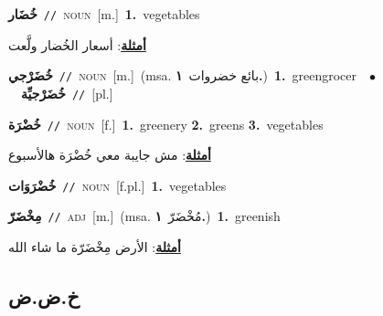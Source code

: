 \documentclass[10pt,a4paper,twoside]{article} %
\begin{document}
\begin{multicols}{2}
{\setlength\topsep{0pt}\textbf{\foreignlanguage{arabic}{خُضَار}}\ {\color{gray}\texttt{//}\color{black}}\ \textsc{noun}\ [m.]\ \textbf{1.}~vegetables\  \begin{flushright}\color{gray}\foreignlanguage{arabic}{\textbf{\underline{\foreignlanguage{arabic}{أمثلة}}}: أسعار الخُضار ولَّعت}\end{flushright}\color{black}} \vspace{2mm}

{\setlength\topsep{0pt}\textbf{\foreignlanguage{arabic}{خُضَرْجي}}\ {\color{gray}\texttt{//}\color{black}}\ \textsc{noun}\ [m.]\ \color{gray}(msa. \foreignlanguage{arabic}{بائع خضروات}~\foreignlanguage{arabic}{\textbf{١.}})\color{black}\ \textbf{1.}~greengrocer\ \ $\bullet$\ \ \setlength\topsep{0pt}\textbf{\foreignlanguage{arabic}{خُضَرْجيِّة}}\ {\color{gray}\texttt{//}\color{black}}\ [pl.]\ } \vspace{2mm}

{\setlength\topsep{0pt}\textbf{\foreignlanguage{arabic}{خُضْرَة}}\ {\color{gray}\texttt{//}\color{black}}\ \textsc{noun}\ [f.]\ \textbf{1.}~greenery  \textbf{2.}~greens  \textbf{3.}~vegetables\  \begin{flushright}\color{gray}\foreignlanguage{arabic}{\textbf{\underline{\foreignlanguage{arabic}{أمثلة}}}: مش جايبة معي خُضْرَة هالأسبوع}\end{flushright}\color{black}} \vspace{2mm}

{\setlength\topsep{0pt}\textbf{\foreignlanguage{arabic}{خُضْرَوَات}}\ {\color{gray}\texttt{//}\color{black}}\ \textsc{noun}\ [f.pl.]\ \textbf{1.}~vegetables\ } \vspace{2mm}

{\setlength\topsep{0pt}\textbf{\foreignlanguage{arabic}{مِخْضَرّ}}\ {\color{gray}\texttt{//}\color{black}}\ \textsc{adj}\ [m.]\ \color{gray}(msa. \foreignlanguage{arabic}{مُخْضَرّ}~\foreignlanguage{arabic}{\textbf{١.}})\color{black}\ \textbf{1.}~greenish\  \begin{flushright}\color{gray}\foreignlanguage{arabic}{\textbf{\underline{\foreignlanguage{arabic}{أمثلة}}}: الأرض مِخْضَرّة ما شاء الله}\end{flushright}\color{black}} \vspace{2mm}

\vspace{-3mm}
\subsection*{\color{blue}\foreignlanguage{arabic}{خ.ض.ض}\color{blue}{}} 


\end{multicols}
\end{document}
